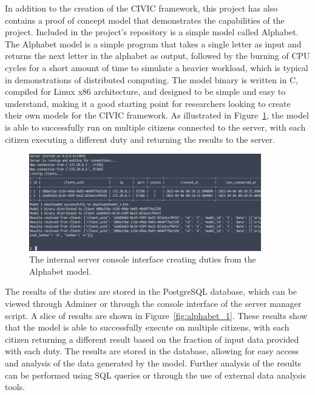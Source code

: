 \documentclass[11pt]{article}
\begin{document}
In addition to the creation of the CIVIC framework, this project has also contains a proof of concept model that demonstrates the capabilities of the project. Included in the project's repository is a simple model called Alphabet. The Alphabet model is a simple program that takes a single letter as input and returns the next letter in the alphabet as output, followed by the burning of CPU cycles for a short amount of time to simulate a heavier workload, which is typical in demonstrations of distributed computing. The model binary is written in C, compiled for Linux x86 architecture, and designed to be simple and easy to understand, making it a good starting point for researchers looking to create their own models for the CIVIC framework. As illustrated in Figure~\ref{fig:internal_server}, the model is able to successfully run on multiple citizens connected to the server, with each citizen executing a different duty and returning the results to the server. 

\begin{figure}[h]
    \centering
    \includegraphics[width=0.9\textwidth]{./figures/internal_server.png}
    \caption{\small The internal server console interface creating duties from the Alphabet model.}
    \label{fig:internal_server}
\end{figure}

The results of the duties are stored in the PostgreSQL database, which can be viewed through Adminer or through the console interface of the server manager script. A slice of results are shown in Figure~\ref{fig:alphabet_1}. These results show that the model is able to successfully execute on multiple citizens, with each citizen returning a different result based on the fraction of input data provided with each duty. The results are stored in the database, allowing for easy access and analysis of the data generated by the model. Further analysis of the results can be performed using SQL queries or through the use of external data analysis tools.
\end{document}
